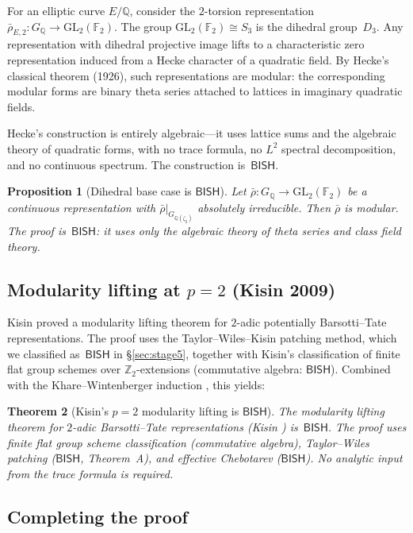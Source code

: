 \documentclass[11pt]{article}
\theoremstyle{plain}
\newtheorem{theorem}{Theorem}[section]
\newtheorem{proposition}[theorem]{Proposition}
\theoremstyle{definition}
\theoremstyle{remark}
\newcommand{\Z}{\mathbb{Z}}
\newcommand{\Q}{\mathbb{Q}}
\newcommand{\F}{\mathbb{F}}
\newcommand{\GL}{\mathrm{GL}}
\newcommand{\BISH}{\mathsf{BISH}}
\begin{document}
For an elliptic curve $E/\Q$, consider the $2$-torsion
representation $\bar{\rho}_{E,2} : G_\Q \to \GL_2(\F_2)$.
The group $\GL_2(\F_2) \cong S_3$ is the dihedral group~$D_3$.
Any representation with dihedral projective image lifts to a
characteristic zero representation induced from a
Hecke character of a quadratic field.  By Hecke's classical
theorem (1926), such representations are modular: the
corresponding modular forms are binary theta series attached
to lattices in imaginary quadratic fields.

Hecke's construction is entirely algebraic---it uses lattice
sums and the algebraic theory of quadratic forms, with no
trace formula, no $L^2$ spectral decomposition, and no
continuous spectrum.  The construction is~$\BISH$.

\begin{proposition}[Dihedral base case is $\BISH$]%
\label{prop:dihedral}
Let $\bar{\rho} : G_\Q \to \GL_2(\F_2)$ be a continuous
representation with $\bar{\rho}|_{G_{\Q(\zeta_2)}}$ absolutely
irreducible.  Then $\bar{\rho}$ is modular.  The proof is~$\BISH$:
it uses only the algebraic theory of theta series and class field
theory.
\end{proposition}

\subsection{Modularity lifting at $p = 2$ (Kisin 2009)}

Kisin \cite{Kisin2009} proved a modularity lifting theorem for
$2$-adic potentially Barsotti--Tate representations.  The proof
uses the Taylor--Wiles--Kisin patching method, which we
classified as~$\BISH$ in \S\ref{sec:stage5}, together with
Kisin's classification of finite flat group schemes over
$\Z_2$-extensions (commutative algebra: $\BISH$).
Combined with the Khare--Wintenberger induction
\cite{KhareWintenberger2009I, KhareWintenberger2009II}, this
yields:

\begin{theorem}[Kisin's $p = 2$ modularity lifting is $\BISH$]%
\label{thm:kisin2}
The modularity lifting theorem for $2$-adic Barsotti--Tate
representations (Kisin \cite{Kisin2009}) is~$\BISH$.
The proof uses finite flat group scheme classification
(commutative algebra), Taylor--Wiles patching ($\BISH$,
Theorem~A), and effective Chebotarev ($\BISH$).
No analytic input from the trace formula is required.
\end{theorem}

\subsection{Completing the proof}
\end{document}
